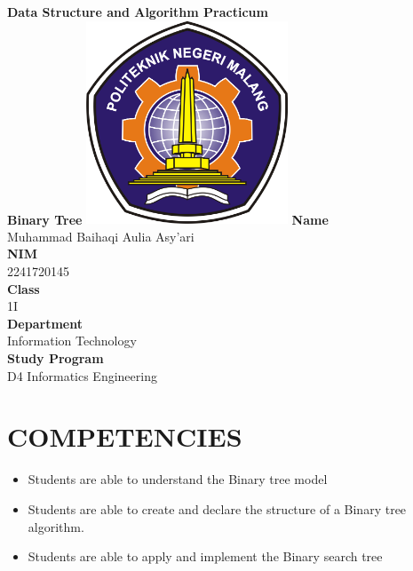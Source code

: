 \documentclass[12pt,titlepage]{article}
\newcommand{\vSubject}{Data Structure and Algorithm Practicum}
\newcommand{\vSubtitle}{Binary Tree}
\newcommand{\vName}{Muhammad Baihaqi Aulia Asy'ari}
\newcommand{\vNIM}{2241720145}
\newcommand{\vClass}{1I}
\newcommand{\vDepartment}{Information Technology}
\newcommand{\vStudyProgram}{D4 Informatics Engineering}
\begin{document}
\begin{titlepage}
    \centering
    \vfill
    {\bfseries\LARGE
        \vSubject\\
        \vskip0.25cm
        \vSubtitle
    }
    \vfill
    \includegraphics[width=6cm]{images/polinema-logo.png}
    \vfill
    {
        \textbf{Name}\\
        \vName\\
        \vskip0.5cm
        \textbf{NIM}\\
        \vNIM\\
        \vskip0.5cm
        \textbf{Class}\\
        \vClass\\
        \vskip0.5cm
        \textbf{Department}\\
        \vDepartment\\
        \vskip0.5cm
        \textbf{Study Program}\\
        \vStudyProgram
    }
\end{titlepage}

\newpage

\section{COMPETENCIES}
\begin{itemize}
    \item Students are able to understand the Binary tree model
    \item Students are able to create and declare the structure of a Binary tree algorithm.
    \item Students are able to apply and implement the Binary search tree
\end{itemize}
\end{document}
